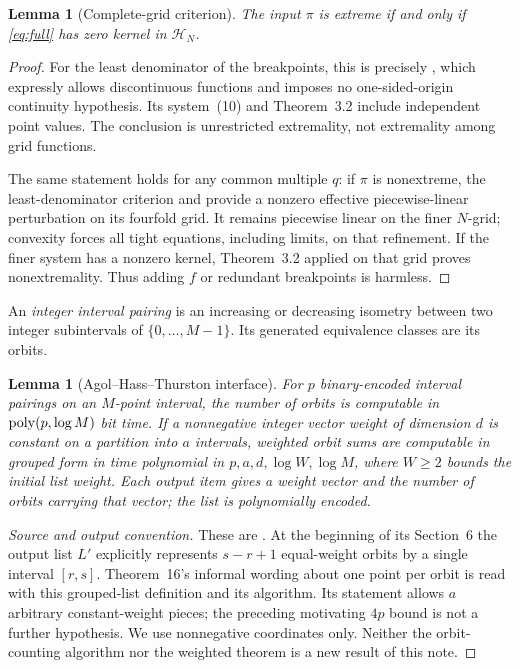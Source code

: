 \documentclass[11pt]{article}
\newtheorem{lemma}[theorem]{Lemma}
\begin{document}
\begin{lemma}[Complete-grid criterion]\label{lem:BHK}
The input $\pi$ is extreme if and only if \eqref{eq:full} has zero kernel in $\mathcal H_N$.
\end{lemma}
\begin{proof}
For the least denominator of the breakpoints, this is precisely \cite[Theorem~4.11]{BHK}, which expressly allows discontinuous functions and imposes no one-sided-origin continuity hypothesis. Its system~(10) and Theorem~3.2 include independent point values. The conclusion is unrestricted extremality, not extremality among grid functions.

The same statement holds for any common multiple $q$: if $\pi$ is nonextreme, the least-denominator criterion and \cite[Theorem~3.2]{BHK} provide a nonzero effective piecewise-linear perturbation on its fourfold grid. It remains piecewise linear on the finer $N$-grid; convexity forces all tight equations, including limits, on that refinement. If the finer system has a nonzero kernel, Theorem~3.2 applied on that grid proves nonextremality. Thus adding $f$ or redundant breakpoints is harmless.
\end{proof}

An \emph{integer interval pairing} is an increasing or decreasing isometry between two integer subintervals of $\{0,\ldots,M-1\}$. Its generated equivalence classes are its orbits.

\begin{lemma}[Agol--Hass--Thurston interface]\label{lem:AHT}
For $p$ binary-encoded interval pairings on an $M$-point interval, the number of orbits is computable in $\operatorname{poly}(p,\log M)$ bit time. If a nonnegative integer vector weight of dimension $d$ is constant on a partition into $a$ intervals, weighted orbit sums are computable in grouped form in time polynomial in $p,a,d,\log W,\log M$, where $W\geq2$ bounds the initial list weight. Each output item gives a weight vector and the number of orbits carrying that vector; the list is polynomially encoded.
\end{lemma}
\begin{proof}[Source and output convention]
These are \cite[Theorems~12 and 16]{AHT}. At the beginning of its Section~6 the output list $L'$ explicitly represents $s-r+1$ equal-weight orbits by a single interval $[r,s]$. Theorem~16's informal wording about one point per orbit is read with this grouped-list definition and its algorithm. Its statement allows $a$ arbitrary constant-weight pieces; the preceding motivating $4p$ bound is not a further hypothesis. We use nonnegative coordinates only. Neither the orbit-counting algorithm nor the weighted theorem is a new result of this note.
\end{proof}
\end{document}
